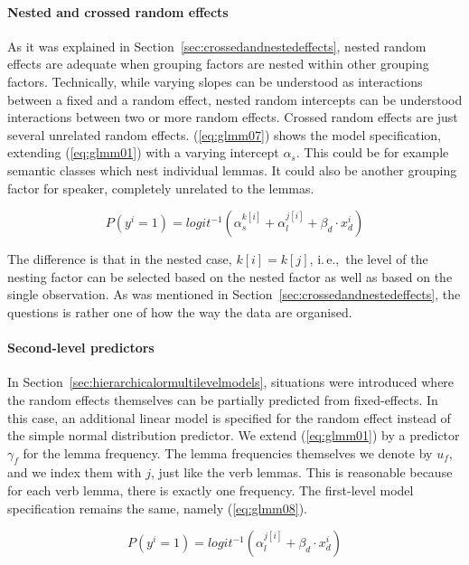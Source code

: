 \documentclass[a4paper,12pt]{article}
\newcommand{\ie}{i.\,e.,\ }
\begin{document}
\paragraph{Nested and crossed random effects}

As it was explained in Section~\ref{sec:crossedandnestedeffects}, nested random effects are adequate when grouping factors are nested within other grouping factors.
Technically, while varying slopes can be understood as interactions between a fixed and a random effect, nested random intercepts can be understood interactions between two or more random effects.
Crossed random effects are just several unrelated random effects.
(\ref{eq:glmm07}) shows the model specification, extending (\ref{eq:glmm01}) with a varying intercept $\alpha_s$.
This could be for example semantic classes which nest individual lemmas.
It could also be another grouping factor for speaker, completely unrelated to the lemmas.

\begin{equation}
  P(y^i=1)=logit^{-1}(\alpha_{s}^{k[i]}+\alpha_{l}^{j[i]}+\beta_d\cdot x_d^i)
  \label{eq:glmm07}
\end{equation}

The difference is that in the nested case, $k[i]=k[j]$, \ie the level of the nesting factor can be selected based on the nested factor as well as based on the single observation.
As was mentioned in Section~\ref{sec:crossedandnestedeffects}, the questions is rather one of how the way the data are organised.

\paragraph{Second-level predictors}

In Section~\ref{sec:hierarchicalormultilevelmodels}, situations were introduced where the random effects themselves can be partially predicted from fixed-effects.
In this case, an additional linear model is specified for the random effect instead of the simple normal distribution predictor.
We extend (\ref{eq:glmm01}) by a predictor $\gamma_f$ for the lemma frequency.
The lemma frequencies themselves we denote by $u_f$, and we index them with $j$, just like the verb lemmas.
This is reasonable because for each verb lemma, there is exactly one frequency.
The first-level model specification remains the same, namely (\ref{eq:glmm08}).

\begin{equation}
  P(y^i=1)=logit^{-1}(\alpha_{l}^{j[i]}+\beta_d\cdot x_d^i)
  \label{eq:glmm08}
\end{equation}
\end{document}

